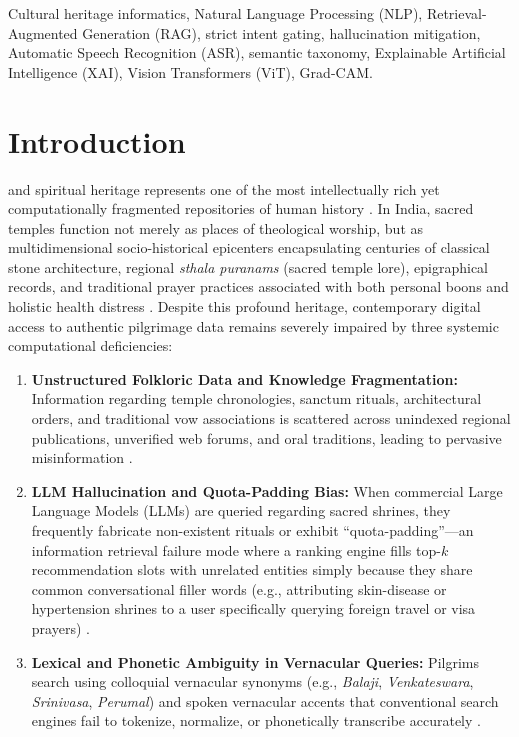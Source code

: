 \documentclass[lettersize,journal]{IEEEtran}
\begin{document}
\begin{IEEEkeywords}
Cultural heritage informatics, Natural Language Processing (NLP), Retrieval-Augmented Generation (RAG), strict intent gating, hallucination mitigation, Automatic Speech Recognition (ASR), semantic taxonomy, Explainable Artificial Intelligence (XAI), Vision Transformers (ViT), Grad-CAM.
\end{IEEEkeywords}

\section{Introduction}
 and spiritual heritage represents one of the most intellectually rich yet computationally fragmented repositories of human history \cite{niccolucci2019metadata}. In India, sacred temples function not merely as places of theological worship, but as multidimensional socio-historical epicenters encapsulating centuries of classical stone architecture, regional \textit{sthala puranams} (sacred temple lore), epigraphical records, and traditional prayer practices associated with both personal boons and holistic health distress \cite{michell1988hindu,kramrisch1976hindu}. Despite this profound heritage, contemporary digital access to authentic pilgrimage data remains severely impaired by three systemic computational deficiencies:
\begin{enumerate}
    \item \textbf{Unstructured Folkloric Data and Knowledge Fragmentation:} Information regarding temple chronologies, sanctum rituals, architectural orders, and traditional vow associations is scattered across unindexed regional publications, unverified web forums, and oral traditions, leading to pervasive misinformation \cite{sharma2020ontology}.
    \item \textbf{LLM Hallucination and Quota-Padding Bias:} When commercial Large Language Models (LLMs) are queried regarding sacred shrines, they frequently fabricate non-existent rituals or exhibit ``quota-padding''---an information retrieval failure mode where a ranking engine fills top-$k$ recommendation slots with unrelated entities simply because they share common conversational filler words (e.g., attributing skin-disease or hypertension shrines to a user specifically querying foreign travel or visa prayers) \cite{huang2024survey}.
    \item \textbf{Lexical and Phonetic Ambiguity in Vernacular Queries:} Pilgrims search using colloquial vernacular synonyms (e.g., \textit{Balaji}, \textit{Venkateswara}, \textit{Srinivasa}, \textit{Perumal}) and spoken vernacular accents that conventional search engines fail to tokenize, normalize, or phonetically transcribe accurately \cite{joshi2020multilingual}.
\end{enumerate}
\end{document}
